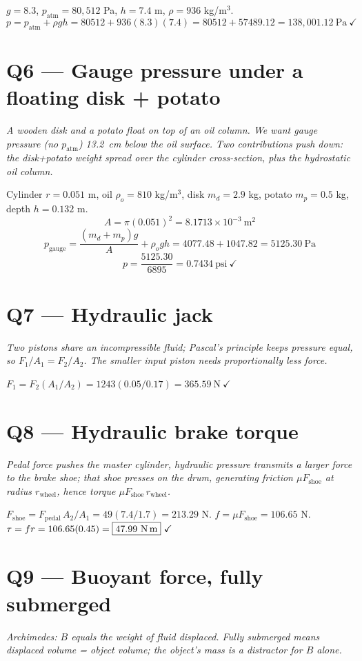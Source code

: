\documentclass[11pt]{article}
\newcommand{\checkmk}{\ensuremath{\checkmark}}
\begin{document}
$g=8.3$, $p_{\text{atm}}=80{,}512$ Pa, $h=7.4$ m, $\rho=936$ kg/m$^3$.
\[ p = p_{\text{atm}} + \rho g h = 80512 + 936(8.3)(7.4) = 80512 + 57489.12 = \boxed{138{,}001.12\ \text{Pa}}\ \checkmk \]

\section*{Q6 --- Gauge pressure under a floating disk + potato}
\emph{A wooden disk and a potato float on top of an oil column. We want gauge pressure (no $p_{\text{atm}}$) 13.2~cm below the oil surface. Two contributions push down: the disk+potato weight spread over the cylinder cross-section, plus the hydrostatic oil column.}

Cylinder $r=0.051$ m, oil $\rho_o=810$ kg/m$^3$, disk $m_d=2.9$ kg, potato $m_p=0.5$ kg, depth $h=0.132$ m.
\[ A = \pi(0.051)^2 = 8.1713\times 10^{-3}\ \text{m}^2 \]
\[ p_{\text{gauge}} = \frac{(m_d+m_p)g}{A} + \rho_o g h = 4077.48 + 1047.82 = 5125.30\ \text{Pa} \]
\[ p = \frac{5125.30}{6895} = \boxed{0.7434\ \text{psi}}\ \checkmk \]

\section*{Q7 --- Hydraulic jack}
\emph{Two pistons share an incompressible fluid; Pascal's principle keeps pressure equal, so $F_1/A_1 = F_2/A_2$. The smaller input piston needs proportionally less force.}

$F_1 = F_2(A_1/A_2) = 1243(0.05/0.17) = \boxed{365.59\ \text{N}}\ \checkmk$

\section*{Q8 --- Hydraulic brake torque}
\emph{Pedal force pushes the master cylinder, hydraulic pressure transmits a larger force to the brake shoe; that shoe presses on the drum, generating friction $\mu F_{\text{shoe}}$ at radius $r_{\text{wheel}}$, hence torque $\mu F_{\text{shoe}}\,r_{\text{wheel}}$.}

$F_{\text{shoe}} = F_{\text{pedal}}\,A_2/A_1 = 49(7.4/1.7) = 213.29$ N.
$f = \mu F_{\text{shoe}} = 106.65$ N. $\tau = f r = 106.65(0.45) = \boxed{47.99\ \text{N\,m}}\ \checkmk$

\section*{Q9 --- Buoyant force, fully submerged}
\emph{Archimedes: $B$ equals the weight of fluid displaced. Fully submerged means displaced volume = object volume; the object's mass is a distractor for $B$ alone.}
\end{document}
